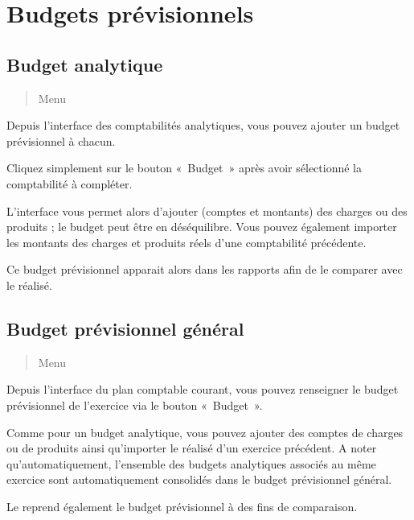 \documentclass[a4paper,10pt,oneside,french]{sphinxmanual}
\begin{document}
\section{Budgets prévisionnels}
\label{\detokenize{accounting/budget:budgets-previsionnels}}\label{\detokenize{accounting/budget::doc}}

\subsection{Budget analytique}
\label{\detokenize{accounting/budget:budget-analytique}}\begin{quote}

Menu 
\end{quote}

Depuis l’interface des comptabilités analytiques, vous pouvez ajouter un budget prévisionnel à chacun.

Cliquez simplement sur le bouton « Budget » après avoir sélectionné la comptabilité à compléter.

L’interface vous permet alors d’ajouter (comptes et montants) des charges ou des produits ; le budget peut être en déséquilibre.
Vous pouvez également importer les montants des charges et produits réels d’une comptabilité précédente.

Ce budget prévisionnel apparait alors dans les rapports afin de le comparer avec le réalisé.


\subsection{Budget prévisionnel général}
\label{\detokenize{accounting/budget:budget-previsionnel-general}}\begin{quote}

Menu 
\end{quote}

Depuis l’interface du plan comptable courant, vous pouvez renseigner le budget prévisionnel de l’exercice via le bouton « Budget ».

Comme pour un budget analytique, vous pouvez ajouter des comptes de charges ou de produits ainsi qu’importer le réalisé d’un exercice précédent.
A noter qu’automatiquement, l’ensemble des budgets analytiques associés au même exercice sont automatiquement consolidés dans le budget prévisionnel général.

Le  reprend également le budget prévisionnel à des fins de comparaison.
\end{document}
